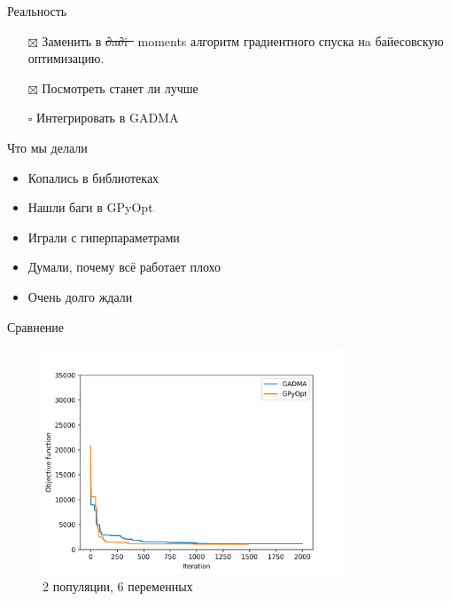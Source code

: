 \documentclass[
  russian,
  ignorenonframetext,
]{beamer}
\providecommand{\tightlist}{%
  \setlength{\itemsep}{0pt}\setlength{\parskip}{0pt}}
\begin{document}
\begin{frame}{Реальность}
\protect\hypertarget{ux440ux435ux430ux43bux44cux43dux43eux441ux442ux44c}{}

\begin{itemize}
\tightlist
\item[$\boxtimes$]
  Заменить в \sout{∂a∂i\ } moments алгоритм градиентного спуска нa
  байесовскую оптимизацию.
\item[$\boxtimes$]
  Посмотреть станет ли лучше
\item[$\square$]
  Интегрировать в GADMA
\end{itemize}

\end{frame}

\begin{frame}{Что мы делали}
\protect\hypertarget{ux447ux442ux43e-ux43cux44b-ux434ux435ux43bux430ux43bux438}{}

\begin{itemize}
\tightlist
\item
  Копались в библиотеках
\item
  Нашли баги в GPyOpt
\item
  Играли с гиперпараметрами
\item
  Думали, почему всё работает плохо
\item
  Очень долго ждали
\end{itemize}

\end{frame}

\begin{frame}{Сравнение}
\protect\hypertarget{ux441ux440ux430ux432ux43dux435ux43dux438ux435}{}

\begin{figure}
\centering
\includegraphics[width=0.8\textwidth,height=\textheight]{./plots/2pop_6.best.log.png}
\caption{2 популяции, 6 переменных}
\end{figure}

\end{frame}
\end{document}
